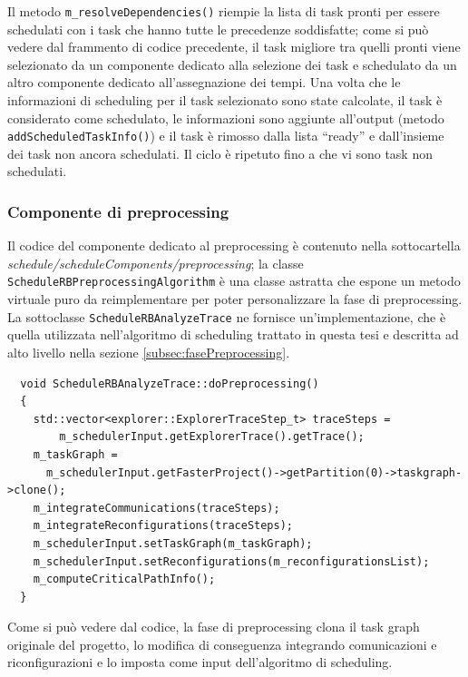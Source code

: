 Il metodo \verb+m_resolveDependencies()+ riempie la lista di task pronti per 
essere schedulati con i task che hanno tutte le precedenze soddisfatte; come si 
può vedere dal frammento di codice precedente, il task migliore tra quelli 
pronti viene selezionato da un componente dedicato alla selezione dei task e 
schedulato da un altro componente dedicato all'assegnazione dei tempi. Una 
volta che le informazioni di scheduling per il task selezionato sono state 
calcolate, il task è considerato come schedulato, le informazioni sono aggiunte 
all'output (metodo \verb+addScheduledTaskInfo()+) e il task è rimosso dalla 
lista ``ready'' e dall'insieme dei task non ancora schedulati. Il ciclo è 
ripetuto fino a che vi sono task non schedulati.

\subsubsection{Componente di preprocessing}
Il codice del componente dedicato al preprocessing è contenuto nella 
sottocartella \emph{schedule/scheduleComponents/preprocessing}; la classe 
\verb+ScheduleRBPreprocessingAlgorithm+ è una classe astratta che espone un 
metodo virtuale puro da reimplementare per poter personalizzare la fase di 
preprocessing. La sottoclasse \verb+ScheduleRBAnalyzeTrace+ ne fornisce 
un'implementazione, che è quella utilizzata nell'algoritmo di scheduling 
trattato in questa tesi e descritta ad alto livello nella sezione 
\ref{subsec:fasePreprocessing}.
\newline
\begin{verbatim}
  void ScheduleRBAnalyzeTrace::doPreprocessing()
  {
    std::vector<explorer::ExplorerTraceStep_t> traceSteps = 
        m_schedulerInput.getExplorerTrace().getTrace();
    m_taskGraph = 
      m_schedulerInput.getFasterProject()->getPartition(0)->taskgraph->clone();
    m_integrateCommunications(traceSteps);
    m_integrateReconfigurations(traceSteps);
    m_schedulerInput.setTaskGraph(m_taskGraph);
    m_schedulerInput.setReconfigurations(m_reconfigurationsList);
    m_computeCriticalPathInfo();
  }
\end{verbatim}

Come si può vedere dal codice, la fase di preprocessing clona il task graph 
originale del progetto, lo modifica di conseguenza integrando comunicazioni e 
riconfigurazioni e lo imposta come input dell'algoritmo di scheduling.

